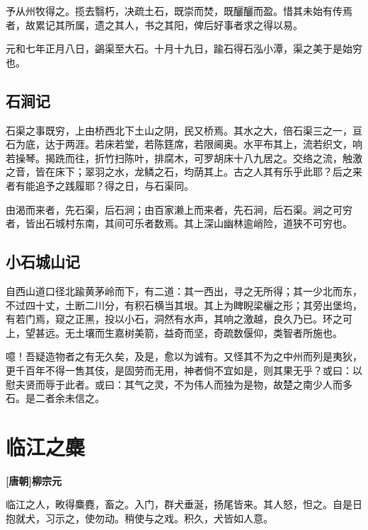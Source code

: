 \documentclass[UTF8,titlepage,oneside]{ctexbook}
\begin{document}
予从州牧得之。揽去翳朽，决疏土石，既崇而焚，既釃釃而盈。惜其未始有传焉者，故累记其所属，遗之其人，书之其阳，俾后好事者求之得以易。

元和七年正月八日，鷁渠至大石。十月十九日，踰石得石泓小潭，渠之美于是始穷也。



\section*{石涧记}


石渠之事既穷，上由桥西北下土山之阴，民又桥焉。其水之大，倍石渠三之一，亘石为底，达于两涯。若床若堂，若陈筳席，若限阃奥。水平布其上，流若织文，响若操琴。揭跣而往，折竹扫陈叶，排腐木，可罗胡床十八九居之。交络之流，触激之音，皆在床下；翠羽之水，龙鳞之石，均荫其上。古之人其有乐乎此耶？后之来者有能追予之践履耶？得之日，与石渠同。

由渴而来者，先石渠，后石涧；由百家濑上而来者，先石涧，后石渠。涧之可穷者，皆出石城村东南，其间可乐者数焉。其上深山幽林逾峭险，道狭不可穷也。



\section*{小石城山记}


自西山道口径北踰黄茅岭而下，有二道：其一西出，寻之无所得；其一少北而东，不过四十丈，土断二川分，有积石横当其垠。其上为睥睨梁欐之形；其旁出堡坞，有若门焉，窥之正黑，投以小石，洞然有水声，其响之激越，良久乃已。环之可上，望甚远。无土壤而生嘉树美箭，益奇而坚，奇疏数偃仰，类智者所施也。

噫！吾疑造物者之有无久矣，及是，愈以为诚有。又怪其不为之中州而列是夷狄，更千百年不得一售其伎，是固劳而无用，神者倘不宜如是，则其果无乎？或曰：以慰夫贤而辱于此者。或曰：其气之灵，不为伟人而独为是物，故楚之南少人而多石。是二者余未信之。


\chapter*{临江之麋}
\begin{center}
	\textbf{[唐朝]柳宗元}
\end{center}

临江之人，畋得麋麑，畜之。入门，群犬垂涎，扬尾皆来。其人怒，怛之。自是日抱就犬，习示之，使勿动。稍使与之戏。积久，犬皆如人意。
\end{document}
